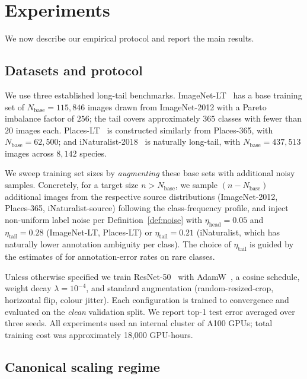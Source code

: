 \documentclass[11pt]{article}
\begin{document}
\section{Experiments} \label{sec:experiments}

We now describe our empirical protocol and report the main results.

\subsection{Datasets and protocol}

We use three established long-tail benchmarks. ImageNet-LT~\cite{liu2019longtail} has a base training set of $N_{\mathrm{base}} = 115{,}846$ images drawn from ImageNet-2012 with a Pareto imbalance factor of $256$; the tail covers approximately $365$ classes with fewer than $20$ images each. Places-LT~\cite{liu2019longtail} is constructed similarly from Places-365, with $N_{\mathrm{base}} = 62{,}500$; and iNaturalist-2018~\cite{vanhorn2018inaturalist} is naturally long-tail, with $N_{\mathrm{base}} = 437{,}513$ images across $8{,}142$ species.

We sweep training set sizes by \emph{augmenting} these base sets with additional noisy samples. Concretely, for a target size $n > N_{\mathrm{base}}$, we sample $(n - N_{\mathrm{base}})$ additional images from the respective source distributions (ImageNet-2012, Places-365, iNaturalist-source) following the class-frequency profile, and inject non-uniform label noise per Definition~\ref{def:noise} with $\eta_{\mathrm{head}} = 0.05$ and $\eta_{\mathrm{tail}} = 0.28$ (ImageNet-LT, Places-LT) or $\eta_{\mathrm{tail}} = 0.21$ (iNaturalist, which has naturally lower annotation ambiguity per class). The choice of $\eta_{\mathrm{tail}}$ is guided by the estimates of \citet{northcutt2021} for annotation-error rates on rare classes.

Unless otherwise specified we train ResNet-50~\cite{he2016} with AdamW~\cite{loshchilov2019}, a cosine schedule, weight decay $\lambda = 10^{-4}$, and standard augmentation (random-resized-crop, horizontal flip, colour jitter). Each configuration is trained to convergence and evaluated on the \emph{clean} validation split. We report top-1 test error averaged over three seeds. All experiments used an internal cluster of A100 GPUs; total training cost was approximately 18{,}000 GPU-hours.

\subsection{Canonical scaling regime}
\end{document}
